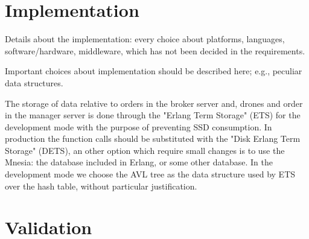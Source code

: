 \documentclass[a4paper, oneside]{memoir}
\begin{document}

\chapter{Implementation}

Details about the implementation: every choice about platforms, languages, software/hardware, middleware, which has not been decided in the requirements.


Important choices about implementation should be described here; e.g., peculiar data structures.

The storage of data relative to orders in the broker server and, drones and order in the manager server is done through the "Erlang Term Storage" (ETS) for the development mode with the purpose of preventing SSD consumption. In production the function calls should be substituted with the "Disk Erlang Term Storage" (DETS), an other option which require small changes is to use the Mnesia: the database included in Erlang, or some other database. In the development mode we choose the AVL tree as the data structure used by ETS over the hash table, without particular justification.

\chapter{Validation}
\end{document}
